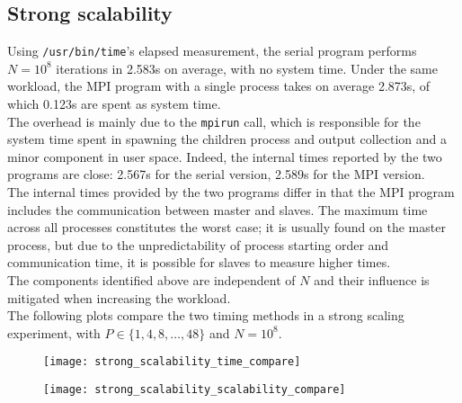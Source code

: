 \documentclass[a4paper, 11pt]{article}
\begin{document}
\subsection{Strong scalability}
Using \texttt{/usr/bin/time}'s elapsed measurement, the serial program performs $N=10^8$ iterations in 2.583s on average, with no system time. Under the same workload, the MPI program with a single process takes on average 2.873s, of which 0.123s are spent as system time.\\
The overhead is mainly due to the \texttt{mpirun} call, which is responsible for the system time spent in spawning the children process and output collection and a minor component in user space. Indeed, the internal times reported by the two programs are close: 2.567s for the serial version, 2.589s for the MPI version.\\
The internal times provided by the two programs differ in that the MPI program includes the communication between master and slaves. The maximum time across all processes constitutes the worst case; it is usually found on the master process, but due to the unpredictability of process starting order and communication time, it is possible for slaves to measure higher times.\\
The components identified above are independent of $N$ and their influence is mitigated when increasing the workload.\\
The following plots compare the two timing methods in a strong scaling experiment, with $P \in \{ 1,4,8,\ldots,48 \}$ and $N=10^{8}$.\\
\begin{figure}[h]
\centering
\begin{minipage}{.5\textwidth}
  \centering
  \texttt{[image: strong\_scalability\_time\_compare]}
  \label{fig:strong_scalability_time_compare}
\end{minipage}%
\begin{minipage}{.5\textwidth}
  \centering
  \texttt{[image: strong\_scalability\_scalability\_compare]}
  \label{fig:strong_scalability_scalability_compare}
\end{minipage}
\end{figure}
\end{document}
